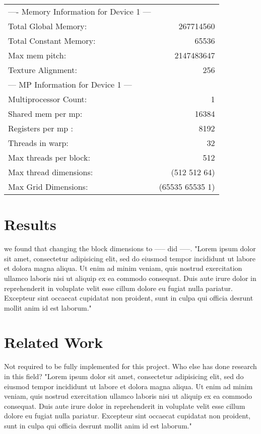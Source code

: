 \documentclass[11pt, twocolumn]{article}
\begin{document}
\begin{tabular}{ l r }
---- Memory Information for Device 1 ---                    \\
Total Global Memory:       &   267714560                    \\
Total Constant Memory:     &   65536                        \\
Max mem pitch:             &   2147483647                   \\
Texture Alignment:         &   256                          \\

--- MP Information for Device 1 ---                         \\
Multiprocessor Count:      &   1                            \\
Shared mem per mp:         &   16384                        \\
Registers per mp :         &   8192                         \\
Threads in warp:           &   32                           \\
Max threads per block:     &   512                          \\
Max thread dimensions:     &   (512 512 64)                 \\
Max Grid Dimensions:       &   (65535 65535 1)              \\

\end{tabular}

\section{Results} %
we found that changing the block dimensions to ----- did -----.
"Lorem ipsum dolor sit amet, consectetur adipisicing elit, sed do eiusmod tempor incididunt ut labore et dolora magna aliqua.  Ut enim ad minim veniam, quis nostrud exercitation ullamco laboris nisi ut aliquip ex ea commodo consequat.  Duis aute irure dolor in reprehenderit in voluplate velit esse cillum dolore eu fugiat nulla pariatur.  Excepteur sint occaecat cupidatat non proident, sunt in culpa qui officia desrunt mollit anim id est laborum."

\section{Related Work} %
Not required to be fully implemented for this project.
Who else has done research in this field?
"Lorem ipsum dolor sit amet, consectetur adipisicing elit, sed do eiusmod tempor incididunt ut labore et dolora magna aliqua.  Ut enim ad minim veniam, quis nostrud exercitation ullamco laboris nisi ut aliquip ex ea commodo consequat.  Duis aute irure dolor in reprehenderit in voluplate velit esse cillum dolore eu fugiat nulla pariatur.  Excepteur sint occaecat cupidatat non proident, sunt in culpa qui officia desrunt mollit anim id est laborum."
\end{document}
